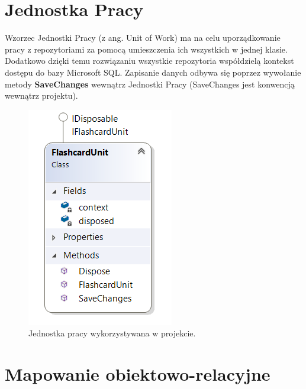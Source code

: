 \section{Jednostka Pracy}

Wzorzec Jednostki Pracy (z ang. Unit of Work)\cite{RepositoryUnitOfWorkPattern} ma na celu uporządkowanie pracy z repozytoriami za pomocą umieszczenia ich wszystkich w jednej klasie. Dodatkowo dzięki temu rozwiązaniu wszystkie repozytoria współdzielą kontekst dostępu do bazy Microsoft SQL. Zapisanie danych odbywa się poprzez wywołanie metody \textbf{SaveChanges} wewnątrz Jednostki Pracy (SaveChanges jest konwencją wewnątrz projektu).

\begin{figure}[h]
	\centering
	\includegraphics{images/UnitOfWork.png}
	 \caption{Jednostka pracy wykorzystywana w projekcie.}
\end{figure}
\newpage

\section{Mapowanie obiektowo-relacyjne}

